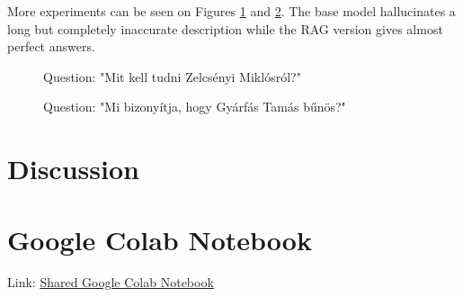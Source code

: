 \documentclass{article}
\begin{document}
    More experiments can be seen on Figures \ref{fig:zelcs} and \ref{fig:gyarfas}. The base model hallucinates a long but completely inaccurate description while the RAG version gives almost perfect answers.

    \begin{figure}[H]
        \centering
        \caption{Question: "Mit kell tudni Zelcsényi Miklósról?"}
        \label{fig:zelcs}
    \end{figure}

    \begin{figure}[H]
        \centering
        \caption{Question: "Mi bizonyítja, hogy Gyárfás Tamás bűnös?"}
        \label{fig:gyarfas}
    \end{figure}

\section{Discussion}



\section{Google Colab Notebook}
    Link: \href{YOUR_COLAB_LINK_HERE}{Shared Google Colab Notebook}
\end{document}
